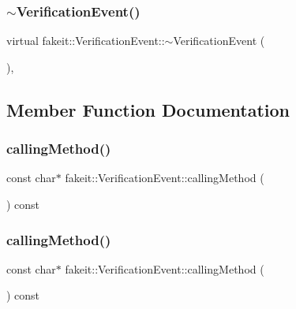 \subsubsection{\texorpdfstring{$\sim$VerificationEvent()}{~VerificationEvent()}\hspace{0.1cm}{\footnotesize\ttfamily [9/9]}}
{\footnotesize\ttfamily virtual fakeit\+::\+Verification\+Event\+::$\sim$\+Verification\+Event (\begin{DoxyParamCaption}{ }\end{DoxyParamCaption})\hspace{0.3cm}{\ttfamily [virtual]}, {\ttfamily [default]}}



\subsection{Member Function Documentation}
\mbox{\label{structfakeit_1_1VerificationEvent_a13a854b648de4ed0a11d9f1bd3d22da5}} 
\subsubsection{\texorpdfstring{callingMethod()}{callingMethod()}\hspace{0.1cm}{\footnotesize\ttfamily [1/9]}}
{\footnotesize\ttfamily const char$\ast$ fakeit\+::\+Verification\+Event\+::calling\+Method (\begin{DoxyParamCaption}{ }\end{DoxyParamCaption}) const\hspace{0.3cm}{\ttfamily [inline]}}

\mbox{\label{structfakeit_1_1VerificationEvent_a13a854b648de4ed0a11d9f1bd3d22da5}} 
\subsubsection{\texorpdfstring{callingMethod()}{callingMethod()}\hspace{0.1cm}{\footnotesize\ttfamily [2/9]}}
{\footnotesize\ttfamily const char$\ast$ fakeit\+::\+Verification\+Event\+::calling\+Method (\begin{DoxyParamCaption}{ }\end{DoxyParamCaption}) const\hspace{0.3cm}{\ttfamily [inline]}}

